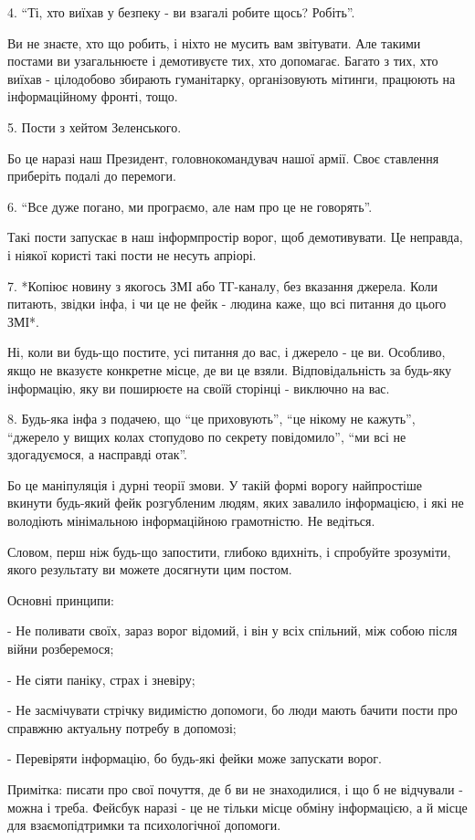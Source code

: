 4. \enquote{Ті, хто виїхав у безпеку - ви взагалі робите щось? Робіть}. 

Ви не знаєте, хто що робить, і ніхто не мусить вам звітувати. Але такими
постами ви узагальнюєте і демотивуєте тих, хто допомагає. Багато з тих, хто
виїхав - цілодобово збирають гуманітарку, організовують мітинги, працюють на
інформаційному фронті, тощо. 

5. Пости з хейтом Зеленського. 

Бо це наразі наш Президент, головнокомандувач нашої армії. Своє ставлення
приберіть подалі до перемоги. 

6. \enquote{Все дуже погано, ми програємо, але нам про це не говорять}. 

Такі пости запускає в наш інформпростір ворог, щоб демотивувати. Це неправда, і
ніякої користі такі пости не несуть апріорі. 

7. *Копіює новину з якогось ЗМІ або ТГ-каналу, без вказання джерела. Коли
питають, звідки інфа, і чи це не фейк - людина каже, що всі питання до цього
ЗМІ*. 

Ні, коли ви будь-що постите, усі питання до вас, і джерело - це ви. Особливо,
якщо не вказуєте конкретне місце, де ви це взяли. Відповідальність за будь-яку
інформацію, яку ви поширюєте на своїй сторінці - виключно на вас. 

8. Будь-яка інфа з подачею, що \enquote{це приховують}, \enquote{це нікому не кажуть}, \enquote{джерело
у вищих колах стопудово по секрету повідомило}, \enquote{ми всі не здогадуємося, а
насправді отак}. 

Бо це маніпуляція і дурні теорії змови. У такій формі ворогу найпростіше
вкинути будь-який фейк розгубленим людям, яких завалило інформацією, і які не
володіють мінімальною інформаційною грамотністю. Не ведіться. 

Словом, перш ніж будь-що запостити, глибоко вдихніть, і спробуйте зрозуміти,
якого результату ви можете досягнути цим постом. 

Основні принципи: 

- Не поливати своїх, зараз ворог відомий, і він у всіх спільний, між собою
після війни розберемося;

- Не сіяти паніку, страх і зневіру;

- Не засмічувати стрічку видимістю допомоги, бо люди мають бачити пости про
справжню актуальну потребу в допомозі; 

- Перевіряти інформацію, бо будь-які фейки може запускати ворог. 

Примітка: писати про свої почуття, де б ви не знаходилися, і що б не відчували
- можна і треба. Фейсбук наразі - це не тільки місце обміну інформацією, а й
місце для взаємопідтримки та психологічної допомоги.
